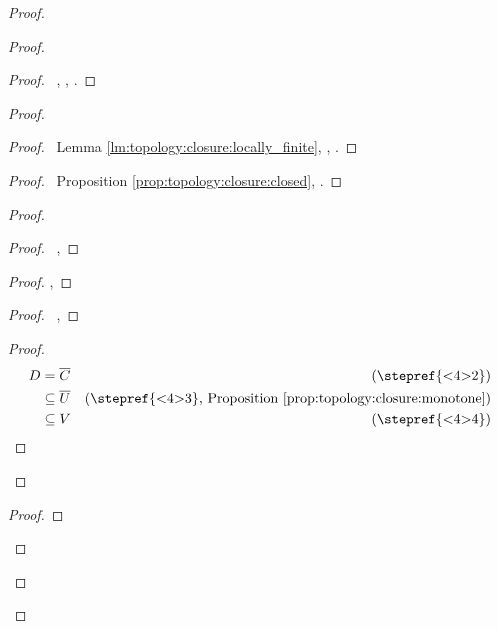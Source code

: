 \begin{proof}
\begin{proof}
  \begin{proof}
    \pf\ , , .
  \end{proof}
  \begin{proof}
    \begin{proof}
      \pf\ Lemma \ref{lm:topology:closure:locally_finite}, , .
    \end{proof}
    \begin{proof}
      \pf\ Proposition \ref{prop:topology:closure:closed}, .
    \end{proof}
    \begin{proof}
      \begin{proof}
        \pf\ , 
      \end{proof}
      \begin{proof}
        \pf {}, 
      \end{proof}
      \begin{proof}
        \pf\ , 
      \end{proof}
      \begin{proof}
        \pf
        \begin{align*}
          D & = \overline{C} & (\text{\stepref{<4>2}}) \\
          & \subseteq \overline{U} & (\text{\stepref{<4>3}, Proposition \ref{prop:topology:closure:monotone}})\\
          & \subseteq V & (\text{\stepref{<4>4}})
        \end{align*}
      \end{proof}
    \end{proof}
    \begin{proof}

\end{proof}
\end{proof}
\end{proof}
\end{proof}
